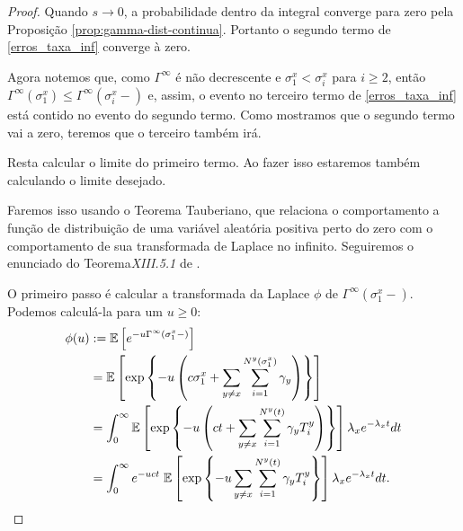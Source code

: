 \begin{proof}
  Quando $s \to 0$, a probabilidade dentro da integral converge para
  zero pela Proposição \ref{prop:gamma-dist-continua}. Portanto o
  segundo termo de \eqref{erros_taxa_inf} converge à zero.

  Agora notemos que, como $\Gamma^\infty$ é não decrescente e $\sigma^x_1
  < \sigma^x_i$ para $i \geq 2$, então $\Gamma^\infty(\sigma^x_1) \leq
  \Gamma^\infty(\sigma^x_i -)$ e, assim, o evento no terceiro termo de
  \eqref{erros_taxa_inf} está contido no evento do segundo
  termo. Como mostramos que o segundo termo vai a zero, teremos
  que o terceiro também irá.

  Resta calcular o limite do primeiro termo. Ao fazer isso
  estaremos também calculando o limite desejado.

  Faremos isso usando o Teorema Tauberiano, que relaciona o
  comportamento a função de distribuição de uma variável aleatória
  positiva perto do zero com o comportamento de sua transformada de
  Laplace no infinito.  Seguiremos o enunciado do
  Teorema\emph{XIII.5.1} de \cite{fellerv2}.

  O primeiro passo é calcular a transformada da Laplace $\phi$ de
  $\Gamma^\infty(\sigma^x_1-)$. Podemos calculá-la para um $u \geq 0$:
  \begin{align*}
    \phi (u) &:= {\mathbb{E}} \left[ e^{-u \Gamma^\infty (\sigma^x_1-)}  \right] \\
    &= {\mathbb{E}} \left[ \exp \left\{ -u \left( c \sigma^x_1+ \sum_{y \neq x}
          \sum_{i = 1}^{N^y(\sigma^x_1)}\gamma_y \right) \right\}
    \right] \\
    &= \int_0^\infty 
    {\mathbb{E}} \left[ \exp \left\{ -u \left( c t + \sum_{y \neq x}
          \sum_{i = 1}^{N^y(t)}\gamma_y T^y_i \right) \right\}
    \right]  \lambda_x e^{-\lambda_x t} d t \\
    &= \int_0^\infty
    e^{-u c t} \;
    {\mathbb{E}} \left[ \exp \left\{ -u \sum_{y \neq x}
          \sum_{i = 1}^{N^y(t)} \gamma_y T^y_i \right\}
    \right]  \lambda_x e^{- \lambda_x t} d t .
  \end{align*}
  

\end{proof}
